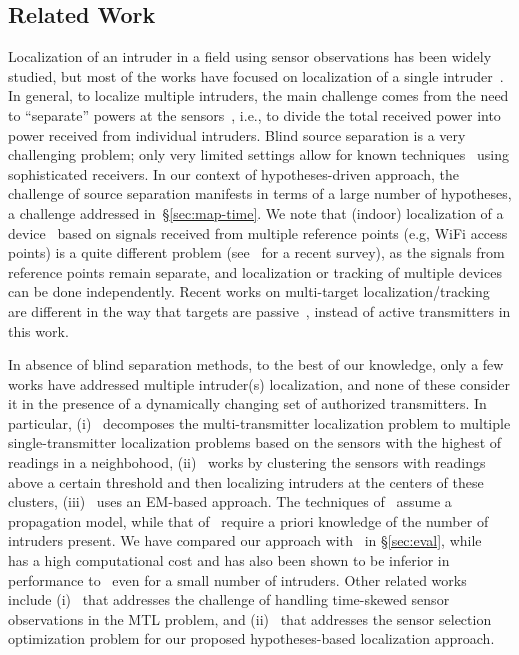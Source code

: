 \subsection{Related Work}
\label{sec:ipsn-related}

Localization of an intruder in a field using sensor observations has
been widely studied, but most of the works have focused on
localization of a single intruder~\cite{arani2018,dutta2016see}.
In general, to localize multiple intruders, the main challenge comes
from the need to ``separate'' powers at the sensors~\cite{mobicom-30},
i.e., to divide the total received power into power received from
individual intruders. Blind source separation is a very challenging
problem; only very limited settings allow for known
techniques~\cite{freq-sig,ben-zhao} using sophisticated receivers. In
our context of hypotheses-driven approach, the challenge of source
separation manifests in terms of a large number of hypotheses, a
challenge addressed in~\S\ref{sec:map-time}.
We note that (indoor) localization of a
  device~\cite{infocom00-radar} based on signals received from multiple reference points (e.g, WiFi access
  points) is a quite different problem
  (see~\cite{zafari-19} for a recent survey), as the signals from
  reference points remain separate, and localization or tracking of multiple
  devices can be done independently.
  Recent works on multi-target localization/tracking are different in the way that targets are passive~\cite{ipsn19-multipassive, ipsn19-chorus, ipsn19-snaploc}, instead of active transmitters in this work.

In absence of blind separation methods, to the best of our knowledge,
only a few works have addressed multiple intruder(s) localization, and
none of these consider it in the presence of a dynamically changing
set of authorized transmitters. In particular,
(i)~\cite{mobicom17-splot} decomposes the multi-transmitter
localization problem to multiple single-transmitter localization
problems based on the sensors with the highest of readings in a
neighbohood, (ii)~\cite{clustering} works by clustering the sensors
with readings above a certain threshold and then localizing intruders
at the centers of these clusters, (iii)~\cite{Quasi-EM} uses an
EM-based approach.
The techniques of~\cite{mobicom17-splot,Quasi-EM} assume a propagation
model, while that of~\cite{clustering,Quasi-EM} require a priori
knowledge of the number of intruders present.  We have compared our
approach with~\cite{mobicom17-splot,clustering} in \S\ref{sec:eval},
while~\cite{Quasi-EM} has a high computational cost and has also been
shown to be inferior in performance
to~\cite{mobicom17-splot,clustering} even for a small number of
intruders. Other related works include
  (i)~\cite{multi-tx-dyspan-19} that addresses the challenge of
  handling time-skewed sensor observations in the MTL problem, and
  (ii)~\cite{info-20} that addresses the sensor selection optimization
  problem for our proposed hypotheses-based localization approach.
  

